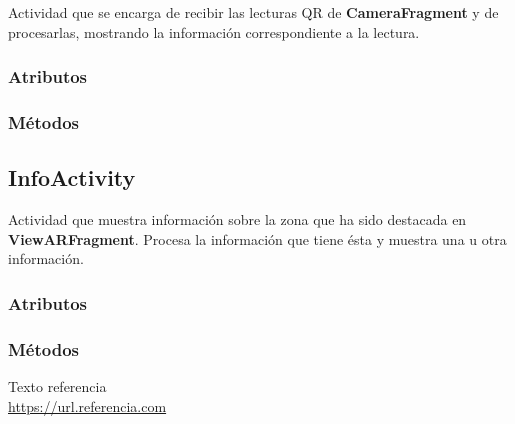 \documentclass[11pt,a4paper]{article}
\begin{document}
Actividad que se encarga de recibir las lecturas QR de \textbf{CameraFragment} y de procesarlas, mostrando la información
correspondiente a la lectura.

\subsubsection{Atributos}

\subsubsection{Métodos}

\subsection{\textbf{InfoActivity}}
\label{sec:info}

Actividad que muestra información sobre la zona que ha sido destacada en \textbf{ViewARFragment}.
Procesa la información que tiene ésta y muestra una u otra información.

\subsubsection{Atributos}
\subsubsection{Métodos}



\newpage

\begin{thebibliography}{5}

Texto referencia
\\\url{https://url.referencia.com}

\end{thebibliography}
\end{document}
